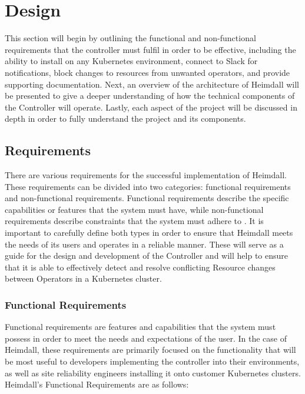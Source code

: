 \documentclass{article}
\begin{document}
\newpage

\section{Design}

This section will begin by outlining the functional and non-functional requirements that the controller must fulfil in order to be effective, including the ability to install on any Kubernetes environment, connect to Slack for notifications, block changes to resources from unwanted operators, and provide supporting documentation. Next, an overview of the architecture of Heimdall will be presented to give a deeper understanding of how the technical components of the Controller will operate. Lastly, each aspect of the project will be discussed in depth in order to fully understand the project and its components.


\subsection{Requirements} \label{requirements}

There are various requirements for the successful implementation of Heimdall. These requirements can be divided into two categories: functional requirements and non-functional requirements. Functional requirements describe the specific capabilities or features that the system must have, while non-functional requirements describe constraints that the system must adhere to \cite{func-vs-nonfunc}. It is important to carefully define both types in order to ensure that Heimdall meets the needs of its users and operates in a reliable manner. These will serve as a guide for the design and development of the Controller and will help to ensure that it is able to effectively detect and resolve conflicting Resource changes between Operators in a Kubernetes cluster.


\subsubsection{Functional Requirements}

Functional requirements are features and capabilities that the system must possess in order to meet the needs and expectations of the user. In the case of Heimdall, these requirements are primarily focused on the functionality that will be most useful to developers implementing the controller into their environments, as well as site reliability engineers installing it onto customer Kubernetes clusters. Heimdall's Functional Requirements are as follows:
\end{document}
